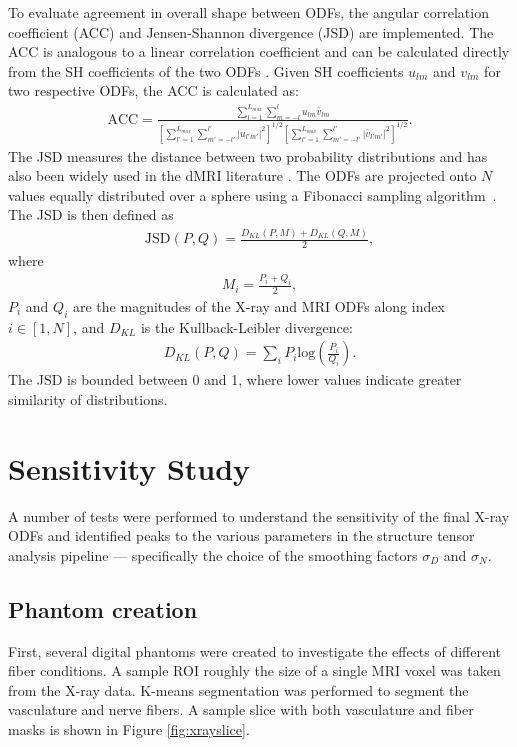\documentclass[11pt]{article}
\begin{document}
To evaluate agreement in overall shape between ODFs, the angular correlation coefficient
(ACC) and Jensen-Shannon divergence (JSD) are implemented. The ACC is analogous to
a linear correlation coefficient and can be calculated directly from the SH
coefficients of the two ODFs \cite{Anderson2005}. Given SH coefficients $u_{lm}$ and $v_{lm}$ for
two respective ODFs, the ACC is calculated as:
\begin{align}
  \text{ACC} = \frac{\sum\limits_{l=1}^{L_{max}}\sum\limits_{m=-l}^l u_{lm}\bar{v}_{lm}}{\left[\sum\limits_{l'=1}^{L_{max}}\sum\limits_{m'=-l'}^{l'}|u_{l'm'}|^2\right]^{1/2}\left[\sum\limits_{l'=1}^{L_{max}}\sum\limits_{m'=-l'}^{l'}|\bar{v}_{l'm'}|^2\right]^{1/2}}.
\end{align}
The JSD measures the distance between two probability distributions and has also
been widely used in the dMRI literature \cite{Cohen-Adad2011}. The ODFs are projected onto
$N$ values equally distributed over a sphere using a Fibonacci sampling algorithm~\cite{Hannay2004}.
The JSD is then defined as
\begin{align}
  \text{JSD}(P, Q) = \frac{D_{KL}(P, M) + D_{KL}(Q, M)}{2},
\end{align}
where
\begin{align}
  M_i = \frac{P_i + Q_i}{2},
\end{align}
$P_i$ and $Q_i$ are the magnitudes of the X-ray and MRI ODFs along index
$i \in [1, N]$, and $D_{KL}$ is the Kullback-Leibler divergence:
\begin{align}
  D_{KL}(P, Q) = \sum_i P_i\text{log}\left(\frac{P_i}{Q_i}\right).
\end{align}
The JSD is bounded between 0 and 1, where lower values indicate greater
similarity of distributions.

\section{Sensitivity Study}
A number of tests were performed to understand the sensitivity of the final
X-ray ODFs and identified peaks to the various parameters in the structure
tensor analysis pipeline --- specifically the choice of the smoothing factors
$\sigma_D$ and $\sigma_N$. 

\subsection{Phantom creation}

First, several digital phantoms were created to investigate the effects of
different fiber conditions. A sample ROI roughly the size of a single MRI voxel
was taken from the X-ray data. K-means segmentation was performed to segment the
vasculature and nerve fibers. A sample slice with both vasculature and fiber
masks is shown in Figure \ref{fig:xrayslice}.
\end{document}
